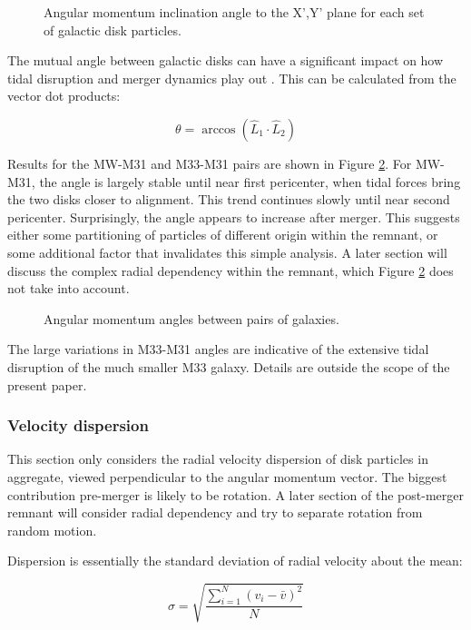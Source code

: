 \documentclass[twocolumn]{aastex63}
\newcommand{\todo}{\color{red}{TODO}\color{black}\hspace{2mm}}
\begin{document}
\begin{figure}[ht!]
	\caption{Angular momentum inclination angle to the X',Y' plane for each set of galactic disk particles.
		\label{fig:inclinations_xy}}
\end{figure}

The mutual angle between galactic disks can have a significant impact on how tidal disruption and merger dynamics play out \todo{ref?}. This can be calculated from the vector dot products:

\[ \theta = \arccos (\hat{L}_1 \cdot \hat{L}_2 ) \]

Results for the MW-M31 and M33-M31 pairs are shown in Figure \ref{fig:inclinations_mutual}. For MW-M31, the angle is largely stable until near first pericenter, when tidal forces bring the two disks closer to alignment. This trend continues slowly until near second pericenter. Surprisingly, the angle appears to increase after merger. This suggests either some partitioning of particles of different origin within the remnant, or some additional factor that invalidates this simple analysis. A later section will discuss the complex radial dependency within the remnant, which Figure \ref{fig:inclinations_mutual} does not take into account.

\begin{figure}[ht!]
	\caption{Angular momentum angles between pairs of galaxies.
		\label{fig:inclinations_mutual}}
\end{figure}

The large variations in M33-M31 angles are indicative of the extensive tidal disruption of the much smaller M33 galaxy. Details are outside the scope of the present paper.

\subsubsection{Velocity dispersion}

This section only considers the radial velocity dispersion of disk particles in aggregate, viewed perpendicular to the angular momentum vector. The biggest contribution pre-merger is likely to be rotation. A later section of the post-merger remnant will consider radial dependency and try to separate rotation from random motion.

Dispersion is essentially the standard deviation of radial velocity about the mean:

\[ \sigma = \sqrt{ \frac{\sum_{i=1}^N(v_i - \bar{v})^2}{N} } \]
\end{document}
